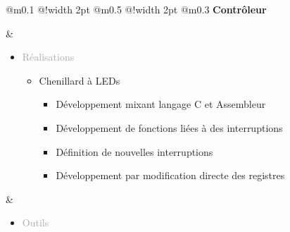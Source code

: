 \documentclass{article}
\begin{document}
\begin{tabular}
    {
        @{}m{}
        @{\hspace{0.001\textwidth}}!{\color{secondaryBlue}\vline width 2pt} %
        @{}m{0.5\textwidth}
        @{\hspace{0.025\textwidth}}!{\color{secondaryBlue}\vline width 2pt} %
        @{{\hspace{0.001\textwidth}}}m{0.3\textwidth}
    }
    \textcolor{secondaryBlue}
    {
        \textbf{\textmu Contrôleur}
    } 

    &
    \begin{itemize}
        [label={}, topsep=8pt, partopsep=0pt, itemsep=0.5pt, parsep=2pt,after=\vspace*{-\baselineskip}]
        \setlength{\itemsep}{10pt}
        \item \textcolor{darkGray}{Réalisations}
        \begin{itemize}
        [label={\textcolor{gray!100}{\checkmark}}, topsep=8pt, partopsep=0pt, itemsep=0.5pt, parsep=2pt, after=\vspace*{-\baselineskip}] 

            \item \textcolor{gray!100}{Chenillard à LEDs}
            \begin{itemize}
                [label={\textcolor{gray!100}{$\triangleright$}}, topsep=0pt, partopsep=0pt, itemsep=0.5pt, parsep=2pt]
                \item \textcolor{gray!100}{Développement mixant langage C et Assembleur}
                \item \textcolor{gray!100}{Développement de fonctions liées à des interruptions}
                \item \textcolor{gray!100}{Définition de nouvelles interruptions}
                \item \textcolor{gray!100}{Développement par modification directe des registres}

            \end{itemize}
        \end{itemize}
    \end{itemize}
    &
    \begin{itemize}
        [label={}, topsep=8pt, partopsep=0pt, itemsep=0.5pt, parsep=2pt,after=\vspace*{-\baselineskip}]
        \setlength{\itemsep}{10pt}
        \item \textcolor{darkGray}{Outils}
        \begin{itemize}
        [label={\textcolor{gray!100}{\checkmark}}, topsep=8pt, partopsep=0pt, itemsep=0.5pt, parsep=2pt,after=\vspace*{-\baselineskip}] 
            

\end{itemize}
\end{itemize}
\end{tabular}
\end{document}
